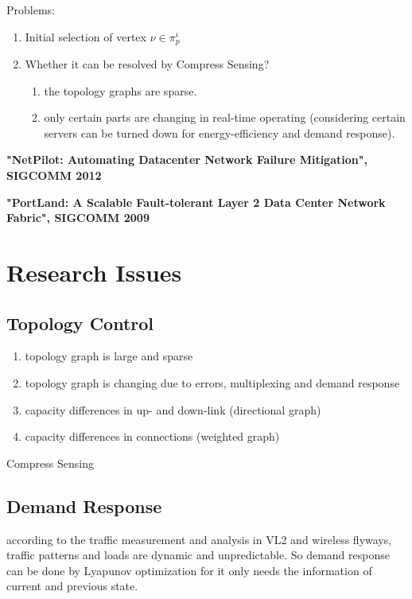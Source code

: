 \documentclass[journal,onecolumn,11pt]{IEEEtran}
\begin{document}
Problems:
\begin{enumerate}
  \item Initial selection of vertex $\nu\in\pi_p^i$
  \item Whether it can be resolved by Compress Sensing?
  \begin{enumerate}
    \item the topology graphs are sparse.
    \item only certain parts are changing in real-time operating (considering certain servers can be turned down for energy-efficiency and demand response).
  \end{enumerate}
\end{enumerate}

\textbf{"NetPilot: Automating Datacenter Network Failure Mitigation", SIGCOMM 2012}

\textbf{"PortLand: A Scalable Fault-tolerant Layer 2 Data Center Network Fabric", SIGCOMM 2009}

\section{Research Issues}

\subsection{Topology Control}

\begin{enumerate}
  \item topology graph is large and sparse
  \item topology graph is changing due to errors, multiplexing and demand response
  \item capacity differences in up- and down-link (directional graph)
  \item capacity differences in connections (weighted graph)
\end{enumerate}

Compress Sensing

\subsection{Demand Response}

according to the traffic measurement and analysis in VL2 and wireless flyways, traffic patterns and loads are dynamic and unpredictable. So demand response can be done by Lyapunov optimization for it only needs the information of current and previous state.
\end{document}
